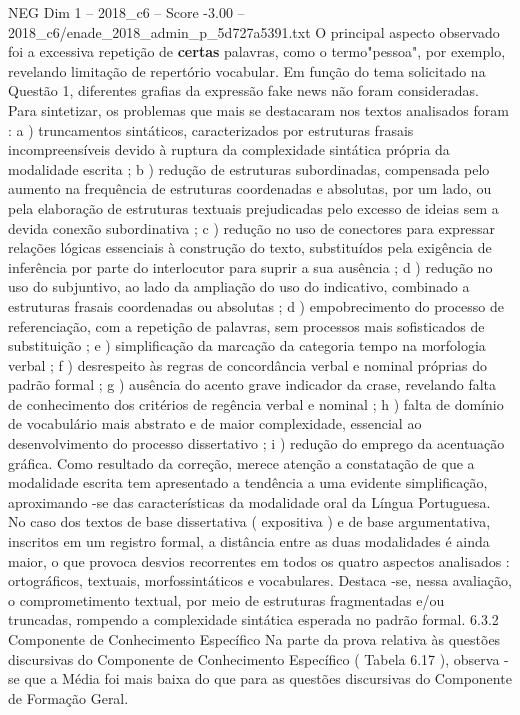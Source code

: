 \begin{textsample}{NEG Dim 1 – 2018\_c6 – Score -3.00 – 2018\_c6/enade\_2018\_admin\_p\_5d727a5391.txt}
O principal aspecto observado foi a excessiva repetição de \textbf{certas} palavras, como o termo"pessoa", por exemplo, revelando limitação de repertório vocabular.
Em função do tema solicitado na Questão 1, diferentes grafias da expressão fake news não foram consideradas.
Para sintetizar, os problemas que mais se destacaram nos textos analisados foram : a ) truncamentos sintáticos, caracterizados por estruturas frasais incompreensíveis devido à ruptura da complexidade sintática própria da modalidade escrita ; b ) redução de estruturas subordinadas, compensada pelo aumento na frequência de estruturas coordenadas e absolutas, por um lado, ou pela elaboração de estruturas textuais prejudicadas pelo excesso de ideias sem a devida conexão subordinativa ; c ) redução no uso de conectores para expressar relações lógicas essenciais à construção do texto, substituídos pela exigência de inferência por parte do interlocutor para suprir a sua ausência ; d ) redução no uso do subjuntivo, ao lado da ampliação do uso do indicativo, combinado a estruturas frasais coordenadas ou absolutas ; d ) empobrecimento do processo de referenciação, com a repetição de palavras, sem processos mais sofisticados de substituição ; e ) simplificação da marcação da categoria tempo na morfologia verbal ; f ) desrespeito às regras de concordância verbal e nominal próprias do padrão formal ; g ) ausência do acento grave indicador da crase, revelando falta de conhecimento dos critérios de regência verbal e nominal ; h ) falta de domínio de vocabulário mais abstrato e de maior complexidade, essencial ao desenvolvimento do processo dissertativo ; i ) redução do emprego da acentuação gráfica.
Como resultado da correção, merece atenção a constatação de que a modalidade escrita tem apresentado a tendência a uma evidente simplificação, aproximando -se das características da modalidade oral da Língua Portuguesa.
No caso dos textos de base dissertativa ( expositiva ) e de base argumentativa, inscritos em um registro formal, a distância entre as duas modalidades é ainda maior, o que provoca desvios recorrentes em todos os quatro aspectos analisados : ortográficos, textuais, morfossintáticos e vocabulares.
Destaca -se, nessa avaliação, o comprometimento textual, por meio de estruturas fragmentadas e/ou truncadas, rompendo a complexidade sintática esperada no padrão formal. 6.3.2 Componente de Conhecimento Específico Na parte da prova relativa às questões discursivas do Componente de Conhecimento Específico ( Tabela 6.17 ), observa -se que a Média foi mais baixa do que para as questões discursivas do Componente de Formação Geral.

\end{textsample}
